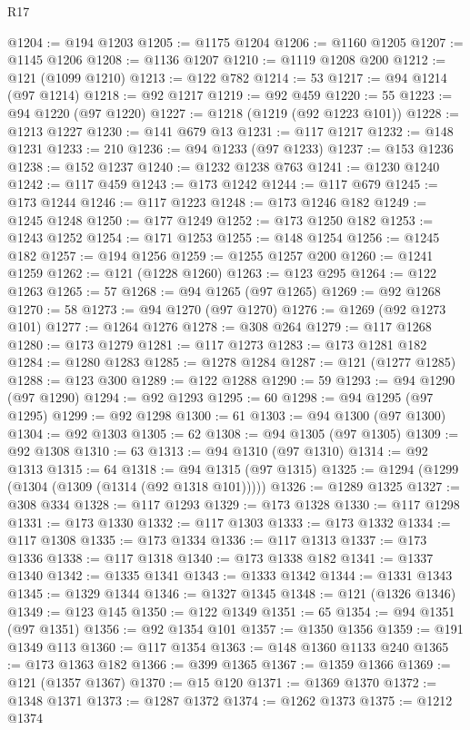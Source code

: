 \begin{lexlean}{R17}
\begin{coremodule}
@1204 := @194 @1203
@1205 := @1175 @1204
@1206 := @1160 @1205
@1207 := @1145 @1206
@1208 := @1136 @1207
@1210 := @1119 @1208 @200
@1212 := @121 (@1099 @1210)
@1213 := @122 @782
@1214 := 53
@1217 := @94 @1214 (@97 @1214)
@1218 := @92 @1217
@1219 := @92 @459
@1220 := 55
@1223 := @94 @1220 (@97 @1220)
@1227 := @1218 (@1219 (@92 @1223 @101))
@1228 := @1213 @1227
@1230 := @141 @679 @13
@1231 := @117 @1217
@1232 := @148 @1231
@1233 := 210
@1236 := @94 @1233 (@97 @1233)
@1237 := @153 @1236
@1238 := @152 @1237
@1240 := @1232 @1238 @763
@1241 := @1230 @1240
@1242 := @117 @459
@1243 := @173 @1242
@1244 := @117 @679
@1245 := @173 @1244
@1246 := @117 @1223
@1248 := @173 @1246 @182
@1249 := @1245 @1248
@1250 := @177 @1249
@1252 := @173 @1250 @182
@1253 := @1243 @1252
@1254 := @171 @1253
@1255 := @148 @1254
@1256 := @1245 @182
@1257 := @194 @1256
@1259 := @1255 @1257 @200
@1260 := @1241 @1259
@1262 := @121 (@1228 @1260)
@1263 := @123 @295
@1264 := @122 @1263
@1265 := 57
@1268 := @94 @1265 (@97 @1265)
@1269 := @92 @1268
@1270 := 58
@1273 := @94 @1270 (@97 @1270)
@1276 := @1269 (@92 @1273 @101)
@1277 := @1264 @1276
@1278 := @308 @264
@1279 := @117 @1268
@1280 := @173 @1279
@1281 := @117 @1273
@1283 := @173 @1281 @182
@1284 := @1280 @1283
@1285 := @1278 @1284
@1287 := @121 (@1277 @1285)
@1288 := @123 @300
@1289 := @122 @1288
@1290 := 59
@1293 := @94 @1290 (@97 @1290)
@1294 := @92 @1293
@1295 := 60
@1298 := @94 @1295 (@97 @1295)
@1299 := @92 @1298
@1300 := 61
@1303 := @94 @1300 (@97 @1300)
@1304 := @92 @1303
@1305 := 62
@1308 := @94 @1305 (@97 @1305)
@1309 := @92 @1308
@1310 := 63
@1313 := @94 @1310 (@97 @1310)
@1314 := @92 @1313
@1315 := 64
@1318 := @94 @1315 (@97 @1315)
@1325 := @1294 (@1299 (@1304 (@1309 (@1314 (@92 @1318 @101)))))
@1326 := @1289 @1325
@1327 := @308 @334
@1328 := @117 @1293
@1329 := @173 @1328
@1330 := @117 @1298
@1331 := @173 @1330
@1332 := @117 @1303
@1333 := @173 @1332
@1334 := @117 @1308
@1335 := @173 @1334
@1336 := @117 @1313
@1337 := @173 @1336
@1338 := @117 @1318
@1340 := @173 @1338 @182
@1341 := @1337 @1340
@1342 := @1335 @1341
@1343 := @1333 @1342
@1344 := @1331 @1343
@1345 := @1329 @1344
@1346 := @1327 @1345
@1348 := @121 (@1326 @1346)
@1349 := @123 @145
@1350 := @122 @1349
@1351 := 65
@1354 := @94 @1351 (@97 @1351)
@1356 := @92 @1354 @101
@1357 := @1350 @1356
@1359 := @191 @1349 @113
@1360 := @117 @1354
@1363 := @148 @1360 @1133 @240
@1365 := @173 @1363 @182
@1366 := @399 @1365
@1367 := @1359 @1366
@1369 := @121 (@1357 @1367)
@1370 := @15 @120
@1371 := @1369 @1370
@1372 := @1348 @1371
@1373 := @1287 @1372
@1374 := @1262 @1373
@1375 := @1212 @1374

\end{coremodule}
\end{lexlean}
